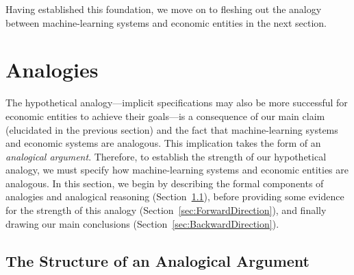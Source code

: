 \documentclass{amsart}
\theoremstyle{indented}
\theoremstyle{indentedProp}
\theoremstyle{indented}
\theoremstyle{indented}
\theoremstyle{indented}
\theoremstyle{indented}
\theoremstyle{indented}
\begin{document}
Having established this foundation, we move on to fleshing out the analogy between machine-learning systems and economic entities in the next section.

\section{Analogies}
\label{sec:Analogies}

The hypothetical analogy---implicit specifications may also be more successful for economic entities to achieve their goals---is a consequence of our main claim (elucidated in the previous section) and the fact that machine-learning systems and economic systems are analogous. This implication takes the form of an {\it analogical argument}. Therefore, to establish the strength of our hypothetical analogy, we must specify how machine-learning systems and economic entities are analogous. In this section, we begin by describing the formal components of analogies and analogical reasoning (Section~\ref{sec:AnalogicalArgument}), before providing some evidence for the strength of this analogy (Section~\ref{sec:ForwardDirection}), and finally drawing our main conclusions (Section~\ref{sec:BackwardDirection}).

\subsection{The Structure of an Analogical Argument}
\label{sec:AnalogicalArgument}
\end{document}
